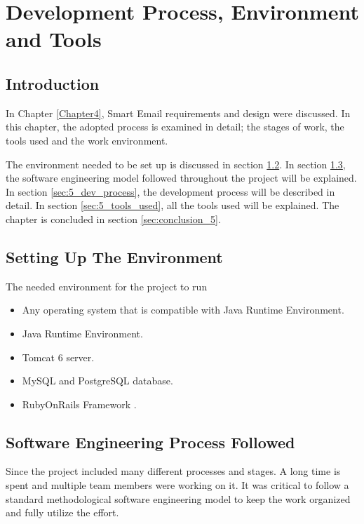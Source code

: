 
\chapter{Development Process, Environment and Tools} %

\label{Chapter5} %


\section{Introduction}
In Chapter \ref{Chapter4}, Smart Email requirements and design were discussed. In this chapter, 
the adopted process is examined in detail; the stages of work, the tools used 
and the work environment.

The environment needed to be set up is discussed in section \ref{sec:5_setting_up_env}.
In section \ref{sec:5_sw_eng_process_followed}, 
the software engineering model followed throughout the project will be explained. 
In section \ref{sec:5_dev_process}, the development process will be described in detail. In section \ref{sec:5_tools_used}, 
all the tools used will be explained. The chapter is concluded in section \ref{sec:conclusion_5}.
\section{Setting Up The Environment}
\label{sec:5_setting_up_env}
The needed environment for the project to run
\begin{itemize}
  \item Any operating system that is compatible with Java Runtime Environment.
  \item Java Runtime Environment.
  \item Tomcat 6 server.
  \item MySQL and PostgreSQL database.
  \item RubyOnRails Framework \cite{ROR}.
\end{itemize}

\section{Software Engineering Process Followed}
\label{sec:5_sw_eng_process_followed}
Since the project included many different processes and stages. A long time is 
spent and multiple team members were working on it. It was critical to follow 
a standard methodological software engineering model to keep the work organized 
and fully utilize the effort.

